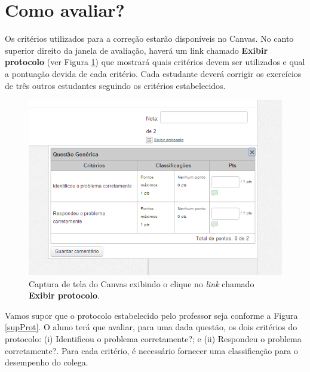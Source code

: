 \documentclass[12pt,a4paper,oneside]{article}
\begin{document}
\section{Como avaliar?} \label{aval}

Os critérios utilizados para a correção estarão disponíveis no {\sf Canvas}. No canto superior direito da janela de avaliação, haverá um link chamado {\bf Exibir protocolo} (ver Figura \ref{canvasProt}) que mostrará quais critérios devem ser utilizados e qual a pontuação devida de cada critério. Cada estudante deverá corrigir os exercícios de três outros estudantes seguindo os critérios estabelecidos.

\begin{figure}[htb]
	\centering
	\includegraphics[width=.6\textwidth]{imagens/exibirProtocolo.png}
	\caption{Captura de tela do {\sf Canvas} exibindo o clique no {\it link} chamado {\bf Exibir protocolo}.}
	\label{canvasProt}
\end{figure}

Vamos supor que o protocolo estabelecido pelo professor seja conforme a Figura \ref{supProt}. O aluno terá que avaliar, para uma dada questão, os dois critérios do protocolo: (i) {\sf Identificou o problema corretamente?}; e (ii) {\sf Respondeu o problema corretamente?}. Para cada critério, é necessário fornecer uma classificação para o desempenho do colega. 
\end{document}
